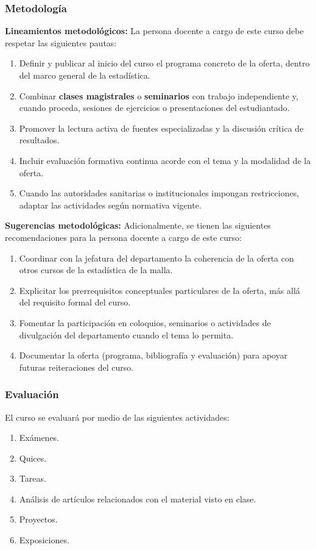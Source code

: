 \begin{refsection}
\subsubsection*{Metodología}

\noindent \textbf{Lineamientos metodológicos:} La persona docente a cargo de este curso debe respetar las siguientes pautas:

\begin{enumerate}
    \item Definir y publicar al inicio del curso el programa concreto de la oferta, dentro del marco general de la estadística.
    \item Combinar \textbf{clases magistrales} o \textbf{seminarios} con trabajo independiente y, cuando proceda, sesiones de ejercicios o presentaciones del estudiantado.
    \item Promover la lectura activa de fuentes especializadas y la discusión crítica de resultados.
    \item Incluir evaluación formativa continua acorde con el tema y la modalidad de la oferta.
    \item Cuando las autoridades sanitarias o institucionales impongan restricciones, adaptar las actividades según normativa vigente.
\end{enumerate}

\textbf{Sugerencias metodológicas:} Adicionalmente, se tienen las siguientes recomendaciones para la persona docente a cargo de este curso:

\begin{enumerate}
    \item Coordinar con la jefatura del departamento la coherencia de la oferta con otros cursos de la estadística de la malla.
    \item Explicitar los prerrequisitos conceptuales particulares de la oferta, más allá del requisito formal del curso.
    \item Fomentar la participación en coloquios, seminarios o actividades de divulgación del departamento cuando el tema lo permita.
    \item Documentar la oferta (programa, bibliografía y evaluación) para apoyar futuras reiteraciones del curso.
\end{enumerate}

\subsubsection*{Evaluación}

El curso se evaluará por medio de las siguientes actividades:

\begin{enumerate}
\item Exámenes.
\item Quices.
\item Tareas.
\item Análisis de artículos relacionados con el material visto en clase.
\item Proyectos.
\item Exposiciones.
\end{enumerate}

\end{refsection}
